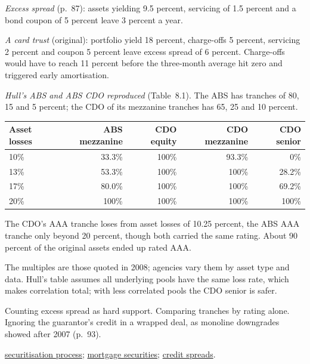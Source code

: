 \begin{qfmethod}
\emph{Excess spread} (p.~87): assets yielding 9.5 percent, servicing of 1.5 percent and a bond coupon of 5 percent leave 3 percent a year.

\emph{A card trust} (original): portfolio yield 18 percent, charge-offs 5 percent, servicing 2 percent and coupon 5 percent leave excess spread of 6 percent. Charge-offs would have to reach 11 percent before the three-month average hit zero and triggered early amortisation.

\emph{Hull's ABS and ABS CDO reproduced} (Table~8.1). The ABS has tranches of 80, 15 and 5 percent; the CDO of its mezzanine tranches has 65, 25 and 10 percent.
\begin{center}\small
\begin{tabular}{@{}lrrrr@{}}
\toprule
Asset losses & ABS mezzanine & CDO equity & CDO mezzanine & CDO senior \\
\midrule
10\% & 33.3\% & 100\% & 93.3\% & 0\% \\
13\% & 53.3\% & 100\% & 100\% & 28.2\% \\
17\% & 80.0\% & 100\% & 100\% & 69.2\% \\
20\% & 100\% & 100\% & 100\% & 100\% \\
\bottomrule
\end{tabular}
\end{center}
The CDO's AAA tranche loses from asset losses of 10.25 percent, the ABS AAA tranche only beyond 20 percent, though both carried the same rating. About 90 percent of the original assets ended up rated AAA.

 The multiples are those quoted in 2008; agencies vary them by asset type and data. Hull's table assumes all underlying pools have the same loss rate, which makes correlation total; with less correlated pools the CDO senior is safer.

 Counting excess spread as hard support. Comparing tranches by rating alone. Ignoring the guarantor's credit in a wrapped deal, as monoline downgrades showed after 2007 (p.~93).

 \hyperref[def:securitisation-process]{securitisation process}; \hyperref[meth:mortgage-securities-prepayment]{mortgage securities}; \hyperref[meth:credit-spread-term-structure]{credit spreads}.

\end{qfmethod}


